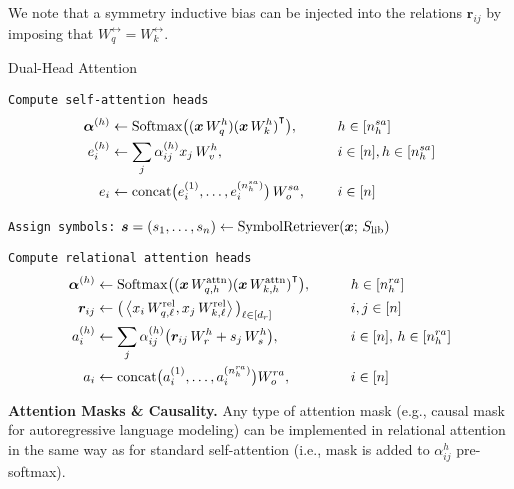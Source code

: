 We note that a symmetry inductive bias can be injected into the relations $\bm{r}_{ij}$ by imposing that $W_{q}^{\rel} = W_k^{\rel}$.


\begin{algorithm}[ht!]
	\caption{Dual-Head Attention}\label{alg:dual_head_attn}

    \vspace{1em}

    \texttt{Compute self-attention heads}
    \begin{align*}
        \bm{\alpha}^{(h)} &\gets \mathrm{Softmax}\big({(\bm{x} \, W_q^h)} {(\bm{x} \, W_k^h)}^\intercal\big), \qquad && h \in [n_h^{sa}] \\
        e_i^{(h)} &\gets \sum_{j} \alpha_{ij}^{(h)} x_j \, W_v^h, \qquad && i \in [n], h \in [n_h^{sa}]\\
        e_i &\gets \mathrm{concat}\big(e_i^{(1)}, \ldots, e_i^{(n_h^{sa})}\big) \, W_o^{sa}, && i \in [n]
    \end{align*}

    \texttt{Assign symbols:} $\bm{s} = (s_1, \ldots, s_n) \gets \mathrm{SymbolRetriever}(\bm{x};\,S_\mathrm{lib})$

    \texttt{Compute relational attention heads}
    \begin{align*}
        \bm{\alpha}^{(h)} &\gets \mathrm{Softmax}\big({(\bm{x} \, W_{q, h}^{\mathrm{attn}})} {(\bm{x} \, W_{k, h}^{\mathrm{attn}})}^\intercal\big), \qquad && h \in [n_h^{ra}] \\
        \bm{r}_{ij} &\gets \big(\left \langle x_i \, W_{q, \ell}^{\mathrm{rel}}, x_j \, W_{k, \ell}^{\mathrm{rel}} \right\rangle\big)_{\ell \in [d_r]} \qquad && i,j \in [n] \\
        a_i^{(h)} &\gets \sum_{j} \alpha_{ij}^{(h)} \big(\bm{r}_{ij}\,W_r^h + s_j \, W_s^{h}\big), \qquad && i \in [n],\, h \in [n_h^{ra}]\\
        a_i &\gets \mathrm{concat}\big(a_i^{(1)}, \ldots, a_i^{(n_h^{ra})}\big) W_o^{ra}, && i \in [n]
    \end{align*}


\end{algorithm}

\textbf{Attention Masks \& Causality.} Any type of attention mask (e.g., causal mask for autoregressive language modeling) can be implemented in relational attention in the same way as for standard self-attention (i.e., mask is added to $\alpha_{ij}^h$ pre-softmax).

